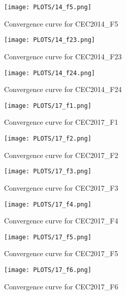 \documentclass[12pt]{article}
\begin{document}
\begin{figure}[H]
    \centering
    \texttt{[image: PLOTS/14\_f5.png]}
    \caption{Convergence curve for CEC2014\_F5}
    \label{fig:conv_cec2014_f5}
\end{figure}

\begin{figure}[H]
    \centering
    \texttt{[image: PLOTS/14\_f23.png]}
    \caption{Convergence curve for CEC2014\_F23}
    \label{fig:conv_cec2014_f23}
\end{figure}

\begin{figure}[H]
    \centering
    \texttt{[image: PLOTS/14\_f24.png]}
    \caption{Convergence curve for CEC2014\_F24}
    \label{fig:conv_cec2014_f24}
\end{figure}
\begin{figure}[H]
    \centering
    \texttt{[image: PLOTS/17\_f1.png]}
    \caption{Convergence curve for CEC2017\_F1}
    \label{fig:conv_cec2017_f1}
\end{figure}

\begin{figure}[H]
    \centering
    \texttt{[image: PLOTS/17\_f2.png]}
    \caption{Convergence curve for CEC2017\_F2}
    \label{fig:conv_cec2017_f2}
\end{figure}

\begin{figure}[H]
    \centering
    \texttt{[image: PLOTS/17\_f3.png]}
    \caption{Convergence curve for CEC2017\_F3}
    \label{fig:conv_cec2017_f3}
\end{figure}

\begin{figure}[H]
    \centering
    \texttt{[image: PLOTS/17\_f4.png]}
    \caption{Convergence curve for CEC2017\_F4}
    \label{fig:conv_cec2017_f4}
\end{figure}

\begin{figure}[H]
    \centering
    \texttt{[image: PLOTS/17\_f5.png]}
    \caption{Convergence curve for CEC2017\_F5}
    \label{fig:conv_cec2017_f5}
\end{figure}

\begin{figure}[H]
    \centering
    \texttt{[image: PLOTS/17\_f6.png]}
    \caption{Convergence curve for CEC2017\_F6}
    \label{fig:conv_cec2017_f6}
\end{figure}
\end{document}
